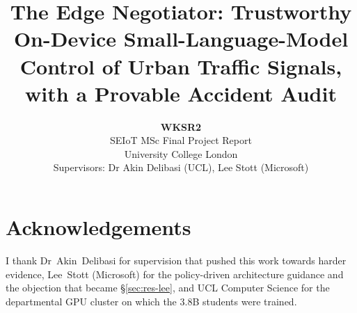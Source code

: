 \documentclass[a4paper]{article}
\title{The Edge Negotiator: Trustworthy On-Device Small-Language-Model Control of Urban Traffic Signals, with a Provable Accident Audit}
\author{
\textbf{WKSR2} \\
SEIoT MSc Final Project Report \Year\\
University College London \\
Supervisors: Dr Akin Delibasi (UCL), Lee Stott (Microsoft)
}
\begin{document}
\maketitle












\section*{Acknowledgements}
I thank Dr~Akin~Delibasi for supervision that pushed this work towards
harder evidence, Lee~Stott (Microsoft) for the policy-driven architecture
guidance and the objection that became \S\ref{sec:res-lee}, and UCL
Computer Science for the departmental GPU cluster on which the 3.8B
students were trained.

\printbibliography

\appendix

\end{document}
